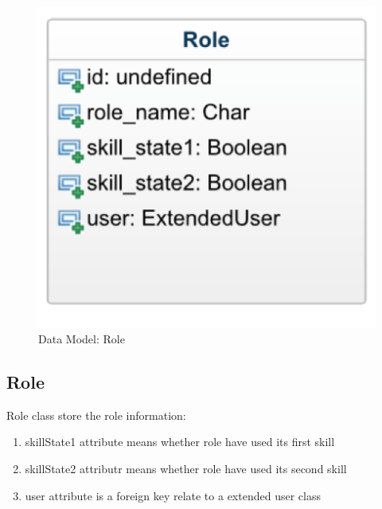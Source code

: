 \documentclass[11pt]{article}
\begin{document}
\begin{figure}
\begin{minipage}{.5\linewidth}
\includegraphics[width=0.9\linewidth, keepaspectratio]{model-role.png}
\caption{Data Model: Role}
\label{fig:func-gamenight}
\end{minipage}
\end{figure}

\subsection{Role}
Role class store the role information:
\begin{enumerate}
\item
skillState1 attribute means whether role have used its first skill
\item
skillState2 attributr means whether role have used its second skill
\item
user attribute is a foreign key relate to a extended user class
\end{enumerate}



\end{document}
